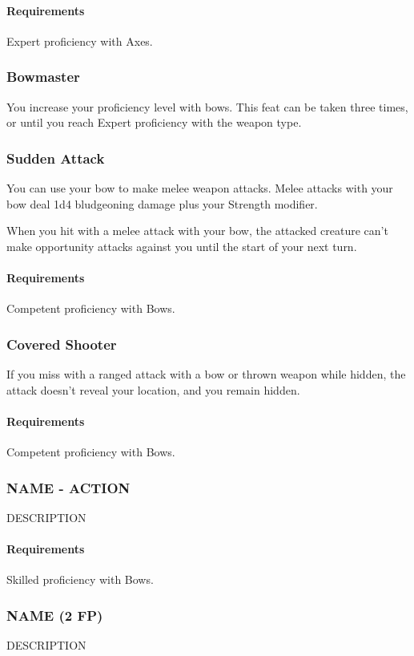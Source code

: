     \paragraph{Requirements} Expert proficiency with Axes.
\subsubsection{Bowmaster} \label{feat::bowmaster}
    You increase your proficiency level with bows.
    This feat can be taken three times, or until you reach Expert proficiency with the weapon type.
\subsubsection{Sudden Attack} \label{feat::suddenattack}
    You can use your bow to make melee weapon attacks.
    Melee attacks with your bow deal 1d4 bludgeoning damage plus your Strength modifier.

    When you hit with a melee attack with your bow, the attacked creature can't make opportunity attacks against you until the start of your next turn.
    \paragraph{Requirements} Competent proficiency with Bows.
\subsubsection{Covered Shooter} \label{feat::coveredshooter}
    If you miss with a ranged attack with a bow or thrown weapon while hidden, the attack doesn't reveal your location, and you remain hidden.
    \paragraph{Requirements} Competent proficiency with Bows.
\subsubsection{NAME - ACTION} \label{feat::name}
    DESCRIPTION
    \paragraph{Requirements} Skilled proficiency with Bows.
\subsubsection{NAME (2 FP)} \label{feat::name}
    DESCRIPTION
